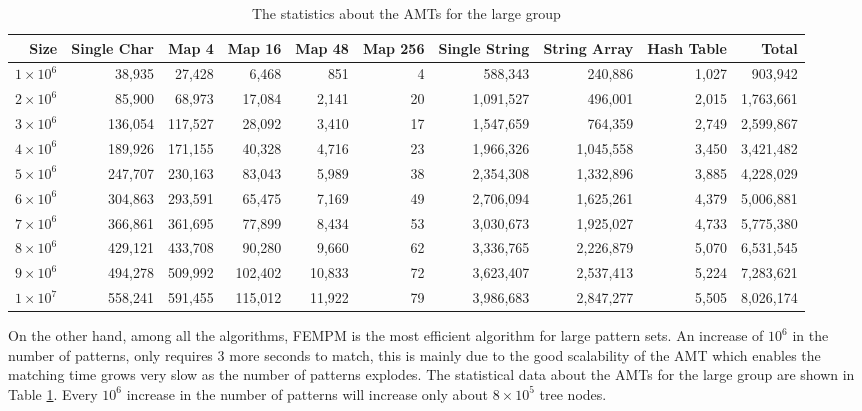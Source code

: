 \documentclass{article}
\begin{document}
\begin{table}[!htp]
  \caption{The statistics about the AMTs for the large group}
  \scriptsize
  \label{tab:large_group}
  \begin{tabular}{rrrrrrrrrr}
 \hline
 Size &
 Single Char &
 Map 4 &
 Map 16 &
 Map 48 &
 Map 256 &
 Single String &
 String Array   &
 Hash Table &
 Total\\
\hline
$1 \times 10^6$ &  38,935 &   27,428  &   6,468 &     851   &    4 &    588,343  &    240,886 &  1,027 &    903,942  \\
$2 \times 10^6$ &  85,900 &   68,973  &  17,084 &   2,141   &   20 &  1,091,527  &    496,001 &  2,015 &  1,763,661  \\
$3 \times 10^6$ & 136,054 &  117,527  &  28,092 &   3,410   &   17 &  1,547,659  &    764,359 &  2,749 &  2,599,867  \\
$4 \times 10^6$ & 189,926 &  171,155  &  40,328 &   4,716   &   23 &  1,966,326  &  1,045,558 &  3,450 &  3,421,482  \\
$5 \times 10^6$ & 247,707 &  230,163  &  83,043 &   5,989   &  38 &  2,354,308   &  1,332,896 &  3,885 &  4,228,029  \\
$6 \times 10^6$ & 304,863 &  293,591  &  65,475 &   7,169   &   49 &  2,706,094  &  1,625,261 &  4,379 &  5,006,881  \\
$7 \times 10^6$ & 366,861 &  361,695  &  77,899 &   8,434   &   53 &  3,030,673  &  1,925,027 &  4,733 &  5,775,380  \\
$8 \times 10^6$ & 429,121 &  433,708  &  90,280 &   9,660   &   62 &  3,336,765  &  2,226,879 &  5,070 &  6,531,545  \\
$9 \times 10^6$ & 494,278 &  509,992  & 102,402 &  10,833   &   72 &  3,623,407  &  2,537,413 &  5,224 &  7,283,621  \\
$1 \times 10^7$ & 558,241 &  591,455  & 115,012 &  11,922   &   79 &  3,986,683  &  2,847,277 &  5,505 &  8,026,174  \\
\hline
\end{tabular}
\end{table}

On the other hand, among all the algorithms, \textsf{FEMPM} is the
most efficient algorithm for large pattern sets. An increase of $10^6$
in the number of patterns, only requires 3 more seconds to match, this
is mainly due to the good scalability of the AMT which enables the
matching time grows very slow as the number of patterns explodes. The
statistical data about the AMTs for the large group are shown in Table
\ref{tab:large_group}. Every $10^6$ increase in the number of patterns
will increase only about $8 \times 10^5$ tree nodes.
\end{document}
